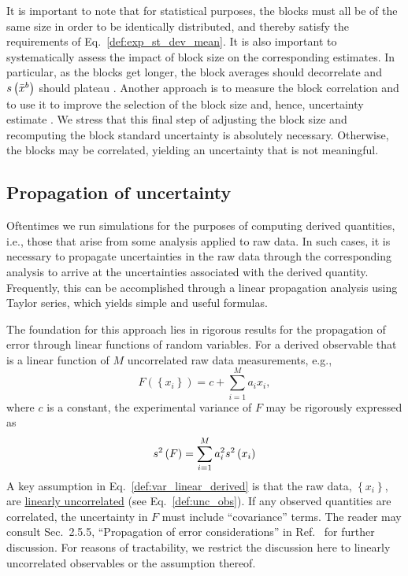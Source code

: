 It is important to note that for statistical purposes, the blocks must all be of the same size in order to be identically distributed, and thereby satisfy the requirements of Eq.~\ref{def:exp_st_dev_mean}.  It is also important to  systematically assess the impact of block size on the corresponding estimates.  In particular, as the blocks get longer, the block averages should decorrelate and $s\left( \bar{x}^b \right)$ should plateau \cite{Flyvbjerg-1989,Grossfield2009}.
Another approach is to measure the block correlation and to use it to improve the selection of the block size and, hence, uncertainty estimate \cite{Kolafa1986}.
We stress that this final step of adjusting the block size and recomputing the block standard uncertainty is absolutely necessary. Otherwise, the blocks may be correlated, yielding an uncertainty that is not meaningful.


\subsection{Propagation of uncertainty}\label{subsec:linear}

Oftentimes we run simulations for the purposes of computing derived quantities, i.e., those that arise from some analysis applied to raw data.  In such cases, it is necessary to propagate uncertainties in the raw data through the corresponding analysis to arrive at the uncertainties associated with the derived quantity.  Frequently, this can be accomplished through a linear propagation analysis using Taylor series, which yields simple and useful formulas.

The foundation for this approach lies in rigorous results for the propagation of error through linear functions of random variables.
For a derived observable that is a linear function of $M$ uncorrelated raw data measurements, e.g.,
%
\begin{equation}
  F\left( \left\{x_i\right\} \right) = c + \sum_{i=1}^M a_i x_i,
  \label{def:linear_derived_obs}
\end{equation}
%
where $c$ is a constant, the experimental variance of $F$ may be rigorously expressed as \cite{NIST_Sematech_eHandbook}
%
\begin{equation}
  s^2\left( F \right) = \sum_{i=1}^M a_i^2 s^2\left( x_i \right)
  \label{def:var_linear_derived}
\end{equation}
%
A key assumption in Eq.~\ref{def:var_linear_derived} is that the raw data, $\left\{x_i\right\}$, are \hyperref[def:unc_obs]{linearly uncorrelated} (see Eq.~\ref{def:unc_obs}). If any observed quantities are correlated, the uncertainty in $F$ must include ``covariance'' terms. The reader may consult Sec.\ 2.5.5, ``Propagation of error considerations'' in Ref.~\cite{NIST_Sematech_eHandbook} for further discussion. For reasons of tractability, we restrict the discussion here to linearly uncorrelated observables or the assumption thereof.

